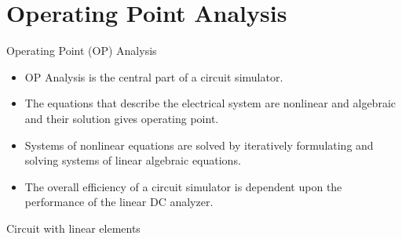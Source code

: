 \documentclass{beamer}
\begin{document}
\section{Operating Point Analysis}
\begin{frame}
\begin{block}{Operating Point (OP) Analysis}
\begin{itemize}
\item OP Analysis is the central part of a circuit simulator.
\item The equations that describe the electrical system are nonlinear and algebraic and their solution gives operating point.
\item Systems of nonlinear equations are solved by iteratively formulating and solving systems of linear algebraic equations. 
\item The overall efficiency of a circuit simulator is dependent upon the performance of the linear DC analyzer.
\end{itemize}
\end{block}
\end{frame}

\begin{frame}
\begin{block}{Circuit with linear elements}
\end{block}
\end{frame}
\end{document}
